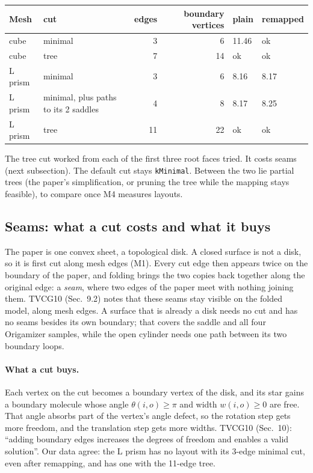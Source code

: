 \documentclass[11pt]{article}
\theoremstyle{definition}
\begin{document}
\begin{center}
\small
\begin{tabular}{@{}llrrll@{}}
\toprule
Mesh & cut & edges & boundary vertices & plain & remapped \\
\midrule
cube & minimal & 3 & 6 & 11.46 & ok \\
cube & tree & 7 & 14 & ok & ok \\
L prism & minimal & 3 & 6 & 8.16 & 8.17 \\
L prism & minimal, plus paths to its 2 saddles & 4 & 8 & 8.17 & 8.25 \\
L prism & tree & 11 & 22 & ok & ok \\
\bottomrule
\end{tabular}
\end{center}

The tree cut worked from each of the first three root faces tried. It costs
seams (next subsection). The default cut stays \texttt{kMinimal}. Between the
two lie partial trees (the paper's simplification, or pruning the tree while
the mapping stays feasible), to compare once M4 measures layouts.

\subsection{Seams: what a cut costs and what it buys}

The paper is one convex sheet, a topological disk. A closed surface is not a
disk, so it is first cut along mesh edges (M1). Every cut edge then appears
twice on the boundary of the paper, and folding brings the two copies back
together along the original edge: a \emph{seam}, where two edges of the paper
meet with nothing joining them. TVCG10 (Sec.~9.2) notes that these seams stay
visible on the folded model, along mesh edges. A surface that is already a
disk needs no cut and has no seams besides its own boundary; that covers the
saddle and all four Origamizer samples, while the open cylinder needs one path
between its two boundary loops.

\paragraph{What a cut buys.} Each vertex on the cut becomes a boundary vertex
of the disk, and its star gains a boundary molecule whose angle
$\theta(i,o) \ge \pi$ and width $w(i,o) \ge 0$ are free. That angle absorbs
part of the vertex's angle defect, so the rotation step gets more freedom,
and the translation step gets more widths. TVCG10 (Sec.~10): ``adding
boundary edges increases the degrees of freedom and enables a valid
solution''. Our data agree: the L prism has no layout with its 3-edge minimal
cut, even after remapping, and has one with the 11-edge tree.
\end{document}

